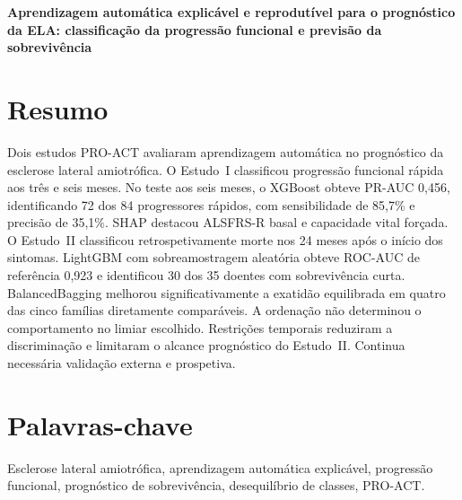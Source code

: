 \begin{center}
\textbf{Aprendizagem automática explicável e reprodutível para o prognóstico da ELA: classificação da progressão funcional e previsão da sobrevivência}
\end{center}

\section*{Resumo}
\label{sec:resumo}

Dois estudos PRO-ACT avaliaram aprendizagem automática no prognóstico da esclerose lateral amiotrófica. O Estudo~I classificou progressão funcional rápida aos três e seis meses. No teste aos seis meses, o XGBoost obteve PR-AUC 0,456, identificando 72 dos 84 progressores rápidos, com sensibilidade de 85,7\% e precisão de 35,1\%. SHAP destacou ALSFRS-R basal e capacidade vital forçada. O Estudo~II classificou retrospetivamente morte nos 24 meses após o início dos sintomas. LightGBM com sobreamostragem aleatória obteve ROC-AUC de referência 0,923 e identificou 30 dos 35 doentes com sobrevivência curta. BalancedBagging melhorou significativamente a exatidão equilibrada em quatro das cinco famílias diretamente comparáveis. A ordenação não determinou o comportamento no limiar escolhido. Restrições temporais reduziram a discriminação e limitaram o alcance prognóstico do Estudo~II. Continua necessária validação externa e prospetiva.

\section*{Palavras-chave}
\label{sec:palavras}

Esclerose lateral amiotrófica, aprendizagem automática explicável, progressão funcional, prognóstico de sobrevivência, desequilíbrio de classes, PRO-ACT.
